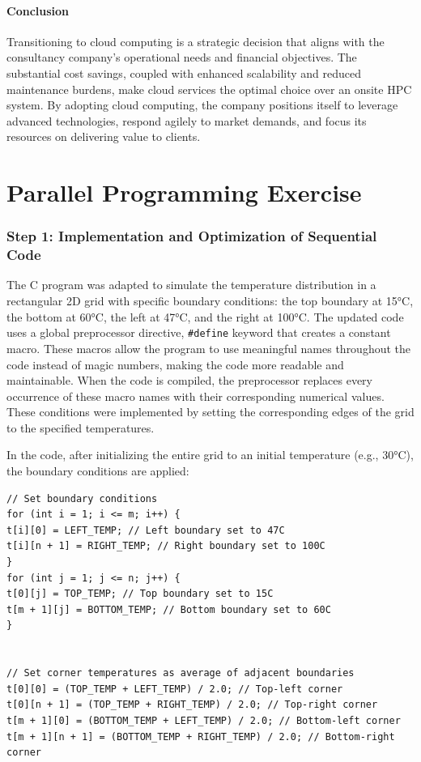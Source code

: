 \documentclass{article}
\begin{document}
\subsection{Conclusion}
Transitioning to cloud computing is a strategic decision that aligns with the consultancy company's operational needs and financial objectives. The substantial cost savings, coupled with enhanced scalability and reduced maintenance burdens, make cloud services the optimal choice over an onsite HPC system. By adopting cloud computing, the company positions itself to leverage advanced technologies, respond agilely to market demands, and focus its resources on delivering value to clients.

\newpage

\part{Parallel Programming Exercise}

\section{Step 1: Implementation and Optimization of Sequential Code}

The C program was adapted to simulate the temperature distribution in a rectangular 2D grid with specific boundary conditions: the top boundary at 15°C, the bottom at 60°C, the left at 47°C, and the right at 100°C. The updated code uses a global preprocessor directive, \texttt{\#define} keyword that creates a constant macro. These macros allow the program to use meaningful names throughout the code instead of magic numbers, making the code more readable and maintainable. When the code is compiled, the preprocessor replaces every occurrence of these macro names with their corresponding numerical values. These conditions were implemented by setting the corresponding edges of the grid to the specified temperatures.

In the code, after initializing the entire grid to an initial temperature (e.g., 30°C), the boundary conditions are applied:

\begin{lstlisting}[style=CStyle, caption={}]
// Set boundary conditions
for (int i = 1; i <= m; i++) {
t[i][0] = LEFT_TEMP; // Left boundary set to 47C
t[i][n + 1] = RIGHT_TEMP; // Right boundary set to 100C
}
for (int j = 1; j <= n; j++) {
t[0][j] = TOP_TEMP; // Top boundary set to 15C
t[m + 1][j] = BOTTOM_TEMP; // Bottom boundary set to 60C
}


// Set corner temperatures as average of adjacent boundaries
t[0][0] = (TOP_TEMP + LEFT_TEMP) / 2.0; // Top-left corner
t[0][n + 1] = (TOP_TEMP + RIGHT_TEMP) / 2.0; // Top-right corner
t[m + 1][0] = (BOTTOM_TEMP + LEFT_TEMP) / 2.0; // Bottom-left corner
t[m + 1][n + 1] = (BOTTOM_TEMP + RIGHT_TEMP) / 2.0; // Bottom-right corner
\end{lstlisting}
\end{document}
